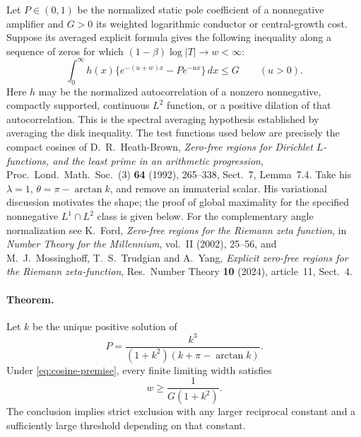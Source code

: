 \documentclass[11pt]{article}
\begin{document}
Let $P\in(0,1)$ be the normalized static pole coefficient of a nonnegative
amplifier and $G>0$ its weighted logarithmic conductor or central-growth
cost. Suppose its averaged explicit formula gives the following inequality
along a sequence of zeros for which $(1-\beta)\log|T|\to w<\infty$:
\begin{equation}
 \int_0^\infty h(x)\{e^{-(u+w)x}-P e^{-ux}\}\,dx\le G
 \qquad (u>0).
 \label{eq:cosine-premise}
\end{equation}
Here $h$ may be the normalized autocorrelation of a nonzero nonnegative,
compactly supported, continuous $L^2$ function, or a positive dilation
of that autocorrelation. This is the spectral averaging hypothesis
established by averaging the disk inequality. The test functions used below
are precisely the compact cosines of D.~R.~Heath-Brown,
\emph{Zero-free regions for Dirichlet $L$-functions, and the least prime
in an arithmetic progression}, Proc.~Lond.~Math.~Soc.~(3) \textbf{64}
(1992), 265--338, Sect.~7, Lemma~7.4. Take his $\lambda=1$,
$\theta=\pi-\arctan k$, and remove an immaterial scalar. His
variational discussion motivates the shape; the proof of global
maximality for the specified nonnegative $L^1\cap L^2$ class is given
below. For the complementary angle normalization see
K.~Ford, \emph{Zero-free regions for the Riemann zeta function}, in
\emph{Number Theory for the Millennium}, vol.~II (2002), 25--56, and
M.~J.~Mossinghoff, T.~S.~Trudgian and A.~Yang,
\emph{Explicit zero-free regions for the Riemann zeta-function},
Res.~Number Theory \textbf{10} (2024), article~11, Sect.~4.

\paragraph{Theorem.}
Let $k$ be the unique positive solution of
\[
 P=\frac{k^3}{(1+k^2)(k+\pi-\arctan k)} .
\]
Under \eqref{eq:cosine-premise}, every finite limiting width satisfies
\[
 w\ge \frac{1}{G(1+k^2)}.
\]
The conclusion implies strict exclusion with any larger reciprocal
constant and a sufficiently large threshold depending on that constant.
\end{document}
